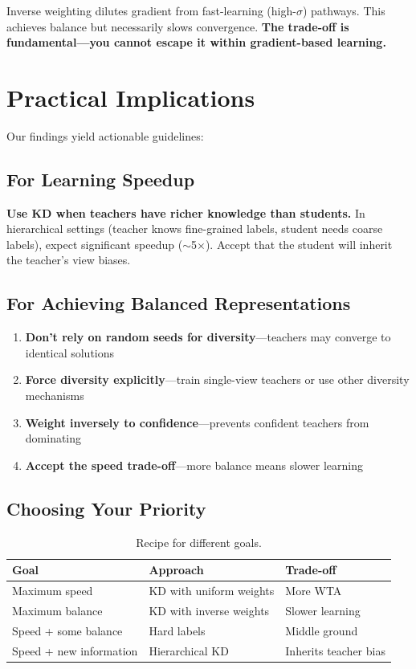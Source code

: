 \documentclass{article}
\begin{document}
Inverse weighting dilutes gradient from fast-learning (high-$\sigma$) pathways. This achieves balance but necessarily slows convergence. \textbf{The trade-off is fundamental---you cannot escape it within gradient-based learning.}

\section{Practical Implications}
\label{sec:practical}

Our findings yield actionable guidelines:

\subsection{For Learning Speedup}

\textbf{Use KD when teachers have richer knowledge than students.} In hierarchical settings (teacher knows fine-grained labels, student needs coarse labels), expect significant speedup ($\sim$5$\times$). Accept that the student will inherit the teacher's view biases.

\subsection{For Achieving Balanced Representations}

\begin{enumerate}
    \item \textbf{Don't rely on random seeds for diversity}---teachers may converge to identical solutions
    \item \textbf{Force diversity explicitly}---train single-view teachers or use other diversity mechanisms
    \item \textbf{Weight inversely to confidence}---prevents confident teachers from dominating
    \item \textbf{Accept the speed trade-off}---more balance means slower learning
\end{enumerate}

\subsection{Choosing Your Priority}

\begin{table}[h]
\centering
\caption{Recipe for different goals.}
\label{tab:recipe}
\begin{tabular}{@{}lll@{}}
\toprule
Goal & Approach & Trade-off \\
\midrule
Maximum speed & KD with uniform weights & More WTA \\
Maximum balance & KD with inverse weights & Slower learning \\
Speed + some balance & Hard labels & Middle ground \\
Speed + new information & Hierarchical KD & Inherits teacher bias \\
\bottomrule
\end{tabular}
\end{table}
\end{document}
